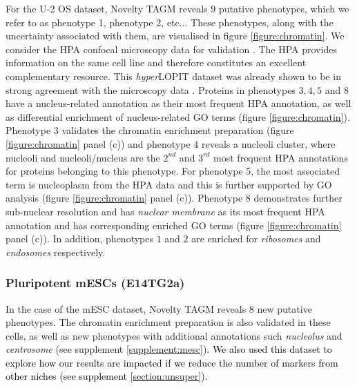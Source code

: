 \documentclass[12pt,english]{article}
\begin{document}
For the U-2 OS dataset, Novelty TAGM reveals $9$ putative phenotypes, which we refer to as phenotype 1, phenotype 2, etc... These phenotypes, along with the uncertainty associated with them, are visualised in figure \ref{figure:chromatin}. We consider the HPA confocal microscopy data for validation \citep{Thul:2017, Sullivan:2018}. The HPA provides information on the same cell line and therefore constitutes an excellent complementary resource. This \textit{hyper}LOPIT dataset was already shown to be in strong agreement with the microscopy data \citep{Thul:2017, DC:2018}. Proteins in phenotypes $3,4,5$ and $8$ have a nucleus-related annotation as their most frequent HPA annotation, as well as differential enrichment of nucleus-related GO terms (figure \ref{figure:chromatin}). Phenotype $3$ validates the chromatin enrichment preparation (figure \ref{figure:chromatin} panel (c)) and phenotype $4$ reveals a nucleoli cluster, where nucleoli and nucleoli/nucleus are the $2^{nd}$ and $3^{rd}$ most frequent HPA annotations for proteins belonging to this phenotype. For phenotype 5, the most associated term is nucleoplasm from the HPA data and this is further supported by GO analysis (figure \ref{figure:chromatin} panel (c)). Phenotype $8$ demonstrates further sub-nuclear resolution and has \textit{nuclear membrane} as its most frequent HPA annotation and has corresponding enriched GO terms (figure \ref{figure:chromatin} panel (c)). In addition, phenotypes $1$ and $2$ are enriched for \textit{ribosomes} and \textit{endosomes} respectively.



\subsubsection{Pluripotent mESCs (E14TG2a)}
In the case of the mESC dataset, Novelty TAGM reveals $8$ new putative phenotypes. The chromatin enrichment preparation is also validated in these cells, as well as new phenotypes with additional annotations such \textit{nucleolus} and \textit{centrosome} (see supplement \ref{supplement:mesc}). \textcolor{black}{We also used this dataset to explore how our results are impacted if we reduce the number of markers from other niches (see supplement \ref{section:unsuper}).}
\end{document}
